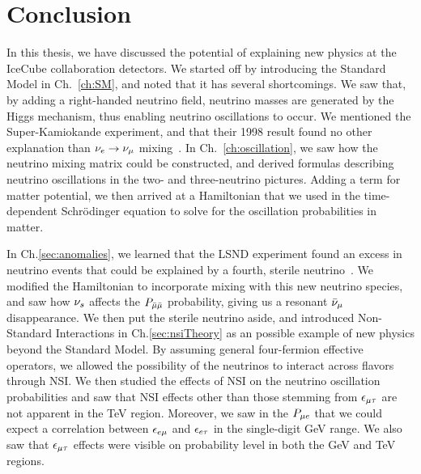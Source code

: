 \chapter{Conclusion}\label{ch:conc}
In this thesis, we have discussed the potential of explaining new physics at the IceCube collaboration detectors.
We started off by introducing the Standard Model in Ch.~\ref{ch:SM}, and noted that it has several shortcomings. We saw that, by adding a right-handed neutrino field,
neutrino masses are generated by the Higgs mechanism, thus enabling neutrino oscillations to occur. 
We mentioned the Super-Kamiokande experiment, and that their 1998 result found no other explanation than $\nu_e \to \nu_\mu$ mixing~\cite{sk1998}. In Ch.~\ref{ch:oscillation},
we saw how the neutrino mixing matrix could be constructed, and derived formulas describing neutrino oscillations in the two- and three-neutrino pictures. Adding a term for matter potential,
we then arrived at a Hamiltonian that we used in the time-dependent Schrödinger equation to solve for the oscillation probabilities in matter.

In Ch.\ref{sec:anomalies}, we learned that the LSND experiment found an excess in neutrino events that could be explained by a fourth, sterile neutrino~\cite{lsnd}.
We modified the Hamiltonian to incorporate mixing with this new neutrino species, and saw how $\nu_s$ affects the $P_{\bar{\mu} \bar{\mu}}$ probability, giving us a resonant $\bar{\nu}_\mu$ disappearance.
We then put the sterile neutrino aside, and introduced Non-Standard Interactions in Ch.\ref{sec:nsiTheory} as an possible example of new physics beyond the Standard Model.
By assuming general four-fermion effective operators, we allowed the possibility of the neutrinos to interact across flavors through NSI. We then studied the effects of
NSI on the neutrino oscillation probabilities and saw that NSI effects other than those stemming from $\epsilon_{\mu\tau}$ are not apparent in the \si{\TeV} region.
Moreover, we saw in the $P_{\mu e}$ that we could expect a correlation between $\epsilon_{e\mu}$ and $\epsilon_{e\tau}$ in the single-digit \si{\GeV} range.
We also saw that $\epsilon_{\mu\tau}$ effects were visible on probability level in both the \si{\GeV} and \si{\TeV} regions.

